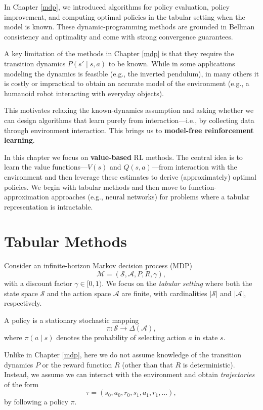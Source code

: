 \documentclass[
]{book}
\theoremstyle{definition}
\theoremstyle{definition}
\theoremstyle{definition}
\theoremstyle{definition}
\theoremstyle{remark}
\begin{document}
In Chapter \ref{mdp}, we introduced algorithms for policy evaluation, policy improvement, and computing optimal policies in the tabular setting when the model is known. These dynamic-programming methods are grounded in Bellman consistency and optimality and come with strong convergence guarantees.

A key limitation of the methods in Chapter \ref{mdp} is that they require the transition dynamics \(P(s' \mid s, a)\) to be known. While in some applications modeling the dynamics is feasible (e.g., the inverted pendulum), in many others it is costly or impractical to obtain an accurate model of the environment (e.g., a humanoid robot interacting with everyday objects).

This motivates relaxing the known-dynamics assumption and asking whether we can design algorithms that learn purely from interaction---i.e., by collecting data through environment interaction. This brings us to \textbf{model-free reinforcement learning}.

In this chapter we focus on \textbf{value-based} RL methods. The central idea is to learn the value functions---\(V(s)\) and \(Q(s,a)\)---from interaction with the environment and then leverage these estimates to derive (approximately) optimal policies. We begin with tabular methods and then move to function-approximation approaches (e.g., neural networks) for problems where a tabular representation is intractable.

\section{Tabular Methods}\label{tabular-methods}

Consider an infinite-horizon Markov decision process (MDP)\\
\[
\mathcal{M} = (\mathcal{S}, \mathcal{A}, P, R, \gamma),
\]
with a discount factor \(\gamma \in [0,1)\). We focus on the \emph{tabular setting} where both the state space \(\mathcal{S}\) and the action space \(\mathcal{A}\) are finite, with cardinalities \(|\mathcal{S}|\) and \(|\mathcal{A}|\), respectively.

A policy is a stationary stochastic mapping\\
\[
\pi: \mathcal{S} \to \Delta(\mathcal{A}),
\]
where \(\pi(a \mid s)\) denotes the probability of selecting action \(a\) in state \(s\).

Unlike in Chapter \ref{mdp}, here we do not assume knowledge of the transition dynamics \(P\) or the reward function \(R\) (other than that \(R\) is deterministic). Instead, we assume we can interact with the environment and obtain \emph{trajectories} of the form\\
\[
\tau = (s_0, a_0, r_0, s_1, a_1, r_1, \dots),
\]
by following a policy \(\pi\).
\end{document}
